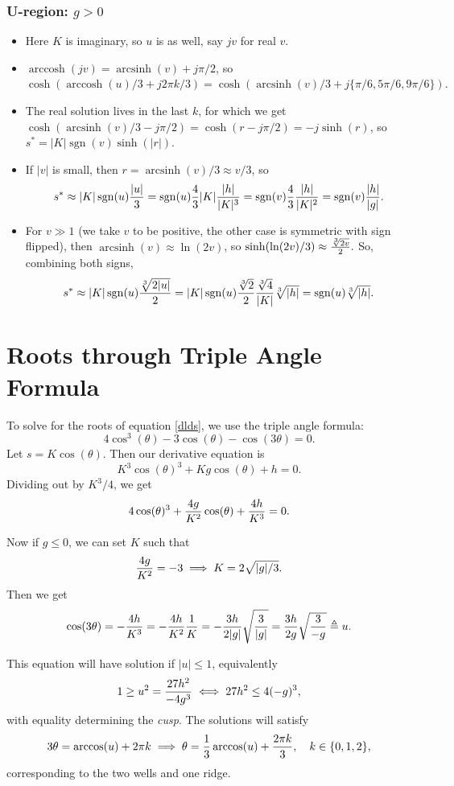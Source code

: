 \documentclass[10pt]{article}
\DeclareMathOperator*{\arcsinh}{arcsinh}
\DeclareMathOperator*{\arccosh}{arccosh}
\DeclareMathOperator*{\sign}{sgn}
\begin{document}
\subsubsection*{U-region: $g>0$}
\begin{itemize}
\item Here $K$ is imaginary, so $u$ is as well, say $j v$ for real $v$.
\item $\arccosh(j v)= \arcsinh(v) + j\pi/2$, so $\cosh(\arccosh(u)/3+ j2\pi k/3) = \cosh(\arcsinh(v)/3 + j\{\pi/6, 5\pi/6, 9\pi/6\}).$
\item The real solution lives in the last $k$, for which we get $\cosh(\arcsinh(v)/3 - j\pi/2) = \cosh(r - j\pi/2)= -j \sinh(r)$, so $s^* = |K| \sign(v) \sinh(|r|)$.
\item If $|v|$ is small, then $r = \arcsinh(v)/3 \approx v/3$, so $$ s^* \approx |K| \sign(u) {|u| \over 3} = \sign(u) {4 \over 3} |K| {|h| \over |K|^3} = \sign(v){4 \over 3}{|h| \over |K|^2} = \sign(v){|h| \over |g|}.$$ 
\item For $v \gg 1$ (we take $v$ to be positive, the other case is symmetric with sign flipped), then $\arcsinh(v) \approx \ln(2v)$, so $\sinh(\ln(2v)/3) \approx {\sqrt[3]{2v} \over 2}.$ So, combining both signs, $$ s^*\approx |K| \sign(u) { \sqrt[3]{2|u|} \over 2} = |K| \sign(u){\sqrt[3]{2} \over 2}{\sqrt[3]{4} \over |K|} \sqrt[3]{|h|} = \sign(u) \sqrt[3]{|h|}.$$
\end{itemize}
\pagebreak
\section*{Roots through Triple Angle Formula}
To solve for the roots of equation \ref{dlds}, we use the triple angle formula: $$ 4 \cos^3(\theta) - 3 \cos(\theta) - \cos(3 \theta) = 0.$$
Let $s = K \cos(\theta).$ Then our derivative equation is $$ K^3 \cos(\theta)^3 + K g \cos(\theta) + h = 0.$$
Dividing out by $K^3/4$, we get $$4 \cos(\theta)^3 + { 4 g \over K^2} \cos(\theta) + {4 h \over K^3} = 0.$$

Now if $g \le 0$, we can set $K$ such that  $${4g \over K^2} = -3 \implies K = 2 \sqrt{|g|/3}.$$ Then we get $$ \cos(3\theta) = -{4 h \over K^3} = -{4 h \over K^2}{ 1 \over K} = -{3 h \over 2 |g|}\sqrt{3 \over |g|} = {3 h \over 2 g} \sqrt{3 \over -g }\triangleq u.$$

This equation will have solution if $|u| \le 1$, equivalently $$ 1 \ge u^2 = {27 h^2 \over -4 g^3} \iff 27 h^2 \le 4(-g)^3,$$ with equality determining the \emph{cusp}. 
The solutions will satisfy 
$$ 3 \theta = \arccos(u) + 2\pi k \implies \theta = {1 \over 3}\arccos(u) + {2 \pi k \over 3}, \quad {k \in \{0,1,2\}},$$ corresponding to the two wells and one ridge.
\end{document}
